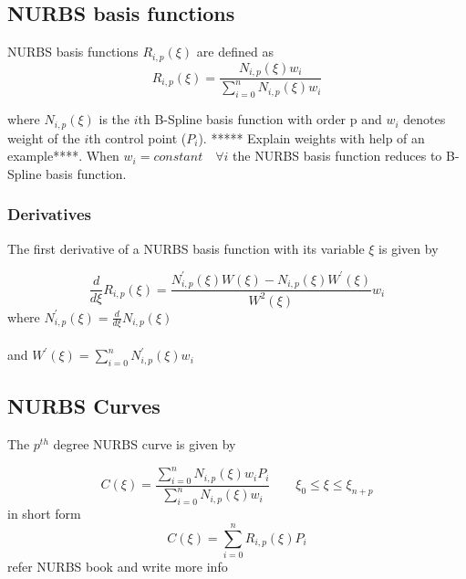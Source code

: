 \documentclass[12pt]{article}
\begin{document}
\subsection{NURBS basis functions}
NURBS basis functions $R_{i,p}(\xi)$ are defined as
\begin{equation}
R_{i,p}(\xi) = \frac{N_{i,p}(\xi)w_{i}}{\sum_{i=0}^{n}N_{i,p}(\xi)w_{i}}
\end{equation}

\noindent
where $N_{i,p}(\xi)$ is the $i$th B-Spline basis function with order p and $w_{i}$ denotes weight of the $i$th control point ($P_i$). ***** Explain weights with help of an example****. When $w_{i} = constant \quad \forall i$ the NURBS basis function reduces to B-Spline basis function.
\subsubsection{Derivatives}
The first derivative of a NURBS basis function with its variable $\xi$ is given by

\begin{equation}
\frac{d }{d \xi} R_{i,p}(\xi) = \frac{N^{'}_{i,p}(\xi)  W(\xi) - N_{i,p}(\xi)  W^{'}(\xi)}{W^{2}(\xi)}w_{i}
\end{equation}
\noindent
where
$N^{'}_{i,p}(\xi) = \frac{d }{d \xi} N_{i,p}(\xi)$  \\
\\
\noindent
and $W^{'}(\xi) =  \sum_{i=0}^{n}N^{'}_{i,p}(\xi) w_i$


\subsection{NURBS Curves }
The $p^{th}$ degree NURBS curve is given by

\begin{equation}
C(\xi) = \frac{\sum_{i=0}^{n}N_{i,p}(\xi)w_{i}P_{i}}{\sum_{i=0}^{n}N_{i,p}(\xi)w_{i}}
\qquad \xi_0 \leq \xi \leq \xi_{n+p}
\end{equation}
in short form
\begin{equation}
C(\xi) = \sum_{i=0}^{n}R_{i,p}(\xi)P_{i}
\end{equation}
refer NURBS book and write more info
\end{document}

